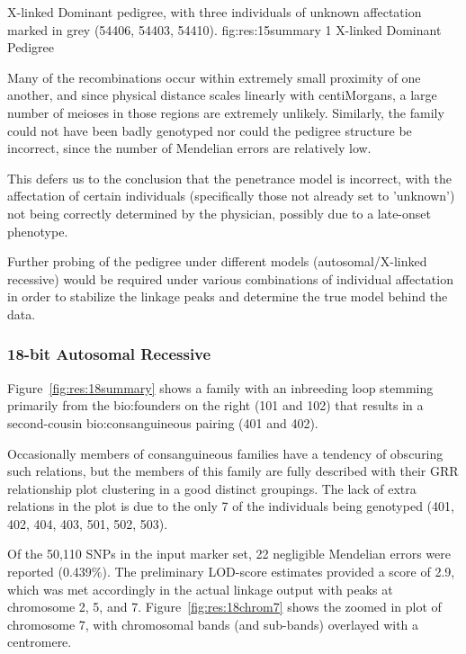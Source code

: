 {X-linked Dominant pedigree, with three individuals of unknown affectation marked in grey (54406, 54403, 54410).}
{fig:res:15summary}
{1}
{X-linked Dominant Pedigree}

Many of the recombinations occur within extremely small proximity of one another, and since physical distance scales linearly with centiMorgans, a large number of meioses in those regions are extremely unlikely. Similarly,  the family could not have been badly genotyped nor could the pedigree structure be incorrect, since the number of Mendelian errors are relatively low.

This defers us to the conclusion that the penetrance model is incorrect, with the affectation of certain individuals (specifically those not already set to 'unknown') not being correctly determined by the physician, possibly due to a late-onset phenotype.

Further probing of the pedigree under different models (autosomal/X-linked recessive)  would be required under various combinations of individual affectation in order to stabilize the linkage peaks and determine the true model behind the data.

\subsubsection*{18-bit Autosomal Recessive}

Figure~\ref{fig:res:18summary} shows a family with an inbreeding loop stemming primarily from the \gls{bio:founders} on the right (101 and 102) that results in a second-cousin \gls{bio:consanguineous} pairing (401 and 402).

Occasionally members of consanguineous families have a tendency of obscuring such relations, but the members of this family are fully described with their GRR relationship plot clustering in a good distinct groupings. The lack of extra relations in the plot is due to the only 7 of the individuals being genotyped (401, 402, 404, 403, 501, 502, 503).

Of the 50,110 SNPs in the input marker set, 22 negligible Mendelian errors were reported (0.439\%). The preliminary  LOD-score estimates provided a score of 2.9, which was met accordingly in the actual linkage output with peaks at chromosome 2, 5, and 7. Figure~\ref{fig:res:18chrom7} shows the zoomed in plot of chromosome 7, with chromosomal bands (and sub-bands) overlayed with a centromere. 

